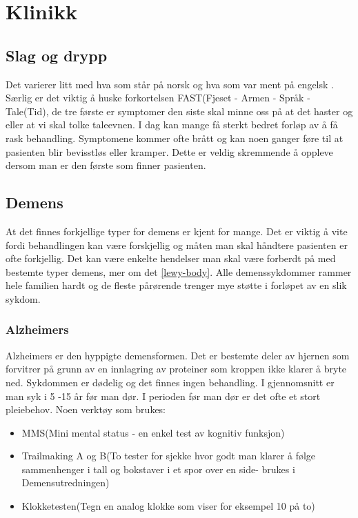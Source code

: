 		\section{Klinikk}
			\subsection{Slag og drypp}
				Det varierer litt med hva som står på norsk og hva som var ment på engelsk\cite{NEL-fast}%
				. Særlig er det viktig å huske forkortelsen FAST(Fjeset - Armen - Språk - Tale(Tid), de tre første er symptomer den siste skal minne oss på at det haster og eller at vi skal tolke taleevnen. I dag kan mange få sterkt bedret forløp av å få rask behandling. Symptomene kommer ofte brått og kan noen ganger føre til at pasienten blir bevisstløs eller kramper. Dette er veldig skremmende å oppleve dersom man er den første som finner pasienten. 
			\subsection{Demens}
				At det finnes forkjellige typer for demens er kjent for mange. Det er viktig å vite fordi behandlingen kan være forskjellig og måten man skal håndtere pasienten er ofte forkjellig. Det kan være enkelte hendelser man skal være forberdt på med bestemte typer demens, mer om det \ref{lewy-body}. Alle demenssykdommer rammer hele familien hardt og de fleste pårørende trenger mye støtte i forløpet av en slik sykdom.
				\subsubsection{Alzheimers}
					Alzheimers er den hyppigte demensformen. Det er bestemte deler av hjernen som forvitrer på grunn av en innlagring av proteiner som kroppen ikke klarer å bryte ned. Sykdommen er dødelig og det finnes ingen behandling. I gjennomsnitt er man syk i 5 -15 år før man dør. I perioden før man dør er det ofte et stort pleiebehov. Noen verktøy som brukes: 
						\begin{itemize}
							\item MMS(Mini mental status - en enkel test av kognitiv funksjon)
							\item Trailmaking A og B(To tester for sjekke hvor godt man klarer å følge sammenhenger i tall og bokstaver i et spor over en side- brukes i Demensutredningen)
							\item Klokketesten(Tegn en analog klokke som viser for eksempel 10 på to)
						\end{itemize} 
